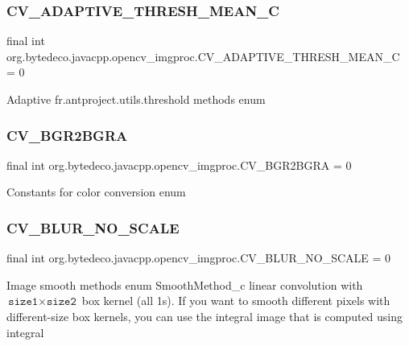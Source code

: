 \subsubsection{\texorpdfstring{C\+V\+\_\+\+A\+D\+A\+P\+T\+I\+V\+E\+\_\+\+T\+H\+R\+E\+S\+H\+\_\+\+M\+E\+A\+N\+\_\+C}{CV\_ADAPTIVE\_THRESH\_MEAN\_C}}
{\footnotesize\ttfamily final int org.\+bytedeco.\+javacpp.\+opencv\+\_\+imgproc.\+C\+V\+\_\+\+A\+D\+A\+P\+T\+I\+V\+E\+\_\+\+T\+H\+R\+E\+S\+H\+\_\+\+M\+E\+A\+N\+\_\+C = 0\hspace{0.3cm}{\ttfamily [static]}}

Adaptive fr.antproject.utils.threshold methods enum \mbox{\label{group__imgproc__c_ga2a997fb46eb3c46bcb8c1a1af53baf03}}
\subsubsection{\texorpdfstring{C\+V\+\_\+\+B\+G\+R2\+B\+G\+RA}{CV\_BGR2BGRA}}
{\footnotesize\ttfamily final int org.\+bytedeco.\+javacpp.\+opencv\+\_\+imgproc.\+C\+V\+\_\+\+B\+G\+R2\+B\+G\+RA = 0\hspace{0.3cm}{\ttfamily [static]}}

Constants for color conversion enum \mbox{\label{group__imgproc__c_ga41b42253aaff66342934c5f37e1d2024}} 
\subsubsection{\texorpdfstring{C\+V\+\_\+\+B\+L\+U\+R\+\_\+\+N\+O\+\_\+\+S\+C\+A\+LE}{CV\_BLUR\_NO\_SCALE}}
{\footnotesize\ttfamily final int org.\+bytedeco.\+javacpp.\+opencv\+\_\+imgproc.\+C\+V\+\_\+\+B\+L\+U\+R\+\_\+\+N\+O\+\_\+\+S\+C\+A\+LE = 0\hspace{0.3cm}{\ttfamily [static]}}

Image smooth methods enum Smooth\+Method\+\_\+c linear convolution with $\texttt{size1}\times\texttt{size2}$ box kernel (all 1\textquotesingle{}s). If you want to smooth different pixels with different-\/size box kernels, you can use the integral image that is computed using integral \mbox{\label{group__imgproc__c_gac8599b677d21172853e57b31a4240338}} 
